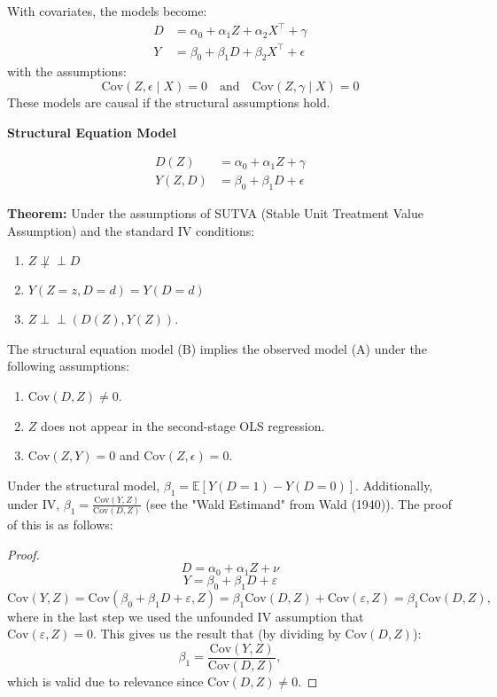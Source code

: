 With covariates, the models become:
\begin{align*}
    D &= \alpha_0 + \alpha_1 Z + \alpha_2 X^\top + \gamma \\
    Y &= \beta_0 + \beta_1 D + \beta_2 X^\top + \epsilon
\end{align*}
with the assumptions:
\[
\text{Cov}(Z, \epsilon \mid X) = 0 \quad \text{and} \quad \text{Cov}(Z, \gamma \mid X) = 0
\]
These models are causal if the structural assumptions hold.

\textbf{Structural Equation Model}

\begin{align*}
    D(Z) &= \alpha_0 + \alpha_1 Z + \gamma \tag{B} \\
    Y(Z, D) &= \beta_0 + \beta_1 D + \epsilon \tag{B}
\end{align*}

\textbf{Theorem:} Under the assumptions of SUTVA (Stable Unit Treatment Value Assumption) and the standard IV conditions:
\begin{enumerate}
    \item {} \(Z \not\perp\!\!\!\perp D\) 
    \item {} \(Y(Z = z, D = d) = Y(D = d)\)
    \item {} \(Z \perp\!\!\!\perp (D(Z), Y(Z))\).
\end{enumerate}

The structural equation model (B) implies the observed model (A) under the following assumptions:
\begin{enumerate}
    \item {} \(\text{Cov}(D, Z) \neq 0\).
    \item {} \(Z\) does not appear in the second-stage OLS regression.
    \item {} \(\text{Cov}(Z, Y) = 0\) and \(\text{Cov}(Z, \epsilon) = 0\).
\end{enumerate}

Under the structural model, $\beta_1 = \mathbb{E}[Y(D=1) - Y(D=0)]$. Additionally, under IV, $\beta_1 = \frac{\text{Cov}(Y,Z)}{\text{Cov}(D,Z)}$ (see the "Wald Estimand" from Wald (1940)). The proof of this is as follows:
\begin{proof}
$$D = \alpha_0 + \alpha_1 Z + \nu$$
$$Y = \beta_0 + \beta_1 D + \varepsilon$$
$$\text{Cov}(Y, Z) = \text{Cov} (\beta_0 + \beta_1 D + \varepsilon, Z) = \beta_1 \text{Cov}(D, Z) + \text{Cov}(\varepsilon, Z) = \beta_1 \text{Cov}(D, Z),$$
where in the last step we used the unfounded IV assumption that $\text{Cov}(\varepsilon, Z) = 0$. This gives us the result that (by dividing by $\text{Cov}(D,Z)$):
$$\beta_1 = \frac{\text{Cov}(Y,Z)}{\text{Cov}(D,Z)},$$
which is valid due to relevance since $\text{Cov}(D, Z) \neq 0$.
\end{proof}

